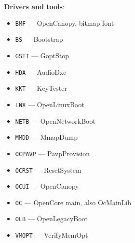 \documentclass[]{article}
\providecommand{\tightlist}{%
  \setlength{\itemsep}{0pt}\setlength{\parskip}{0pt}}
\begin{document}
\begin{enumerate}
  \textbf{Drivers and tools}:
  \begin{itemize}
  \tightlist
  \item \texttt{BMF} --- OpenCanopy, bitmap font
  \item \texttt{BS} --- Bootstrap
  \item \texttt{GSTT} --- GoptStop
  \item \texttt{HDA} --- AudioDxe
  \item \texttt{KKT} --- KeyTester
  \item \texttt{LNX} --- OpenLinuxBoot
  \item \texttt{NETB} --- OpenNetworkBoot
  \item \texttt{MMDD} --- MmapDump
  \item \texttt{OCPAVP} --- PavpProvision
  \item \texttt{OCRST} --- ResetSystem
  \item \texttt{OCUI} --- OpenCanopy
  \item \texttt{OC} --- OpenCore main, also OcMainLib
  \item \texttt{OLB} --- OpenLegacyBoot
  \item \texttt{VMOPT} --- VerifyMemOpt
  \end{itemize}


\end{enumerate}
\end{document}
